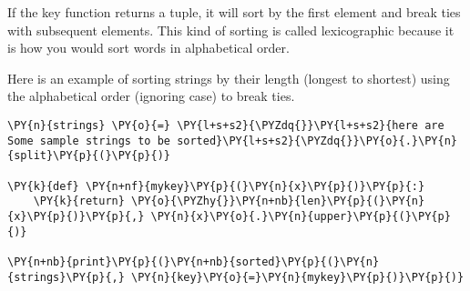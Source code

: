 If the key function returns a tuple, it will sort by the first element and break ties with subsequent elements.  This kind of sorting is called lexicographic because it is how you would sort words in alphabetical order.


Here is an example of sorting strings by their length (longest to shortest) using the alphabetical order (ignoring case) to break ties.

\begin{Verbatim}[commandchars=\\\{\}]
\PY{n}{strings} \PY{o}{=} \PY{l+s+s2}{\PYZdq{}}\PY{l+s+s2}{here are Some sample strings to be sorted}\PY{l+s+s2}{\PYZdq{}}\PY{o}{.}\PY{n}{split}\PY{p}{(}\PY{p}{)}

\PY{k}{def} \PY{n+nf}{mykey}\PY{p}{(}\PY{n}{x}\PY{p}{)}\PY{p}{:}
    \PY{k}{return} \PY{o}{\PYZhy{}}\PY{n+nb}{len}\PY{p}{(}\PY{n}{x}\PY{p}{)}\PY{p}{,} \PY{n}{x}\PY{o}{.}\PY{n}{upper}\PY{p}{(}\PY{p}{)}

\PY{n+nb}{print}\PY{p}{(}\PY{n+nb}{sorted}\PY{p}{(}\PY{n}{strings}\PY{p}{,} \PY{n}{key}\PY{o}{=}\PY{n}{mykey}\PY{p}{)}\PY{p}{)}
\end{Verbatim}
